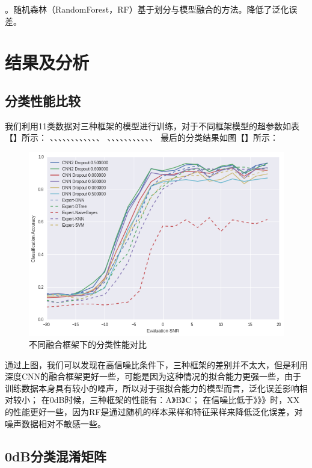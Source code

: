 。随机森林（RandomForest，RF）基于划分与模型融合的方法。降低了泛化误差。

\section{结果及分析}

\subsection{分类性能比较}
我们利用11类数据对三种框架的模型进行训练，对于不同框架模型的超参数如表【】所示：
、、、、、、、、、、、、
、、、、、、、、、、、
最后的分类结果如图【】所示：

\begin{figure}[!h]
	\centering
	\includegraphics[scale=0.6]{figures/chapter_4/fig_4_5}
	\caption{不同融合框架下的分类性能对比}\label{sec:fig_4_5}
\end{figure}

通过上图，我们可以发现在高信噪比条件下，三种框架的差别并不太大，但是利用深度CNN的融合框架更好一些，可能是因为这种情况的拟合能力更强一些，由于训练数据本身具有较小的噪声，所以对于强拟合能力的模型而言，泛化误差影响相对较小；
在0dB时候，三种框架的性能有：A》B》C；
在信噪比低于》》》时，XX的性能更好一些，因为RF是通过随机的样本采样和特征采样来降低泛化误差，对噪声数据相对不敏感一些。

\subsection{0dB分类混淆矩阵}

